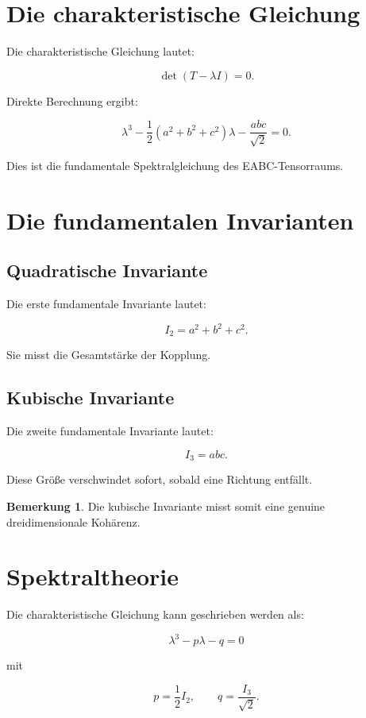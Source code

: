 \documentclass[11pt,a4paper]{article}
\theoremstyle{definition}
\newtheorem{bemerkung}{Bemerkung}
\begin{document}
	\section{Die charakteristische Gleichung}
	
	Die charakteristische Gleichung lautet:
	
	\[
	\det(T-\lambda I)=0.
	\]
	
	Direkte Berechnung ergibt:
	
	\[
	\lambda^3
	-\frac12(a^2+b^2+c^2)\lambda
	-\frac{abc}{\sqrt2}=0.
	\]
	
	Dies ist die fundamentale Spektralgleichung des EABC-Tensorraums.
	
	\section{Die fundamentalen Invarianten}
	
	\subsection{Quadratische Invariante}
	
	Die erste fundamentale Invariante lautet:
	
	\[
	I_2=a^2+b^2+c^2.
	\]
	
	Sie misst die Gesamtstärke der Kopplung.
	
	\subsection{Kubische Invariante}
	
	Die zweite fundamentale Invariante lautet:
	
	\[
	I_3=abc.
	\]
	
	Diese Größe verschwindet sofort, sobald eine Richtung entfällt.
	
	\begin{bemerkung}
		Die kubische Invariante misst somit eine genuine dreidimensionale Kohärenz.
	\end{bemerkung}
	
	\section{Spektraltheorie}
	
	Die charakteristische Gleichung kann geschrieben werden als:
	
	\[
	\lambda^3-p\lambda-q=0
	\]
	
	mit
	
	\[
	p=\frac12I_2,
	\qquad
	q=\frac{I_3}{\sqrt2}.
	\]
	
\end{document}
